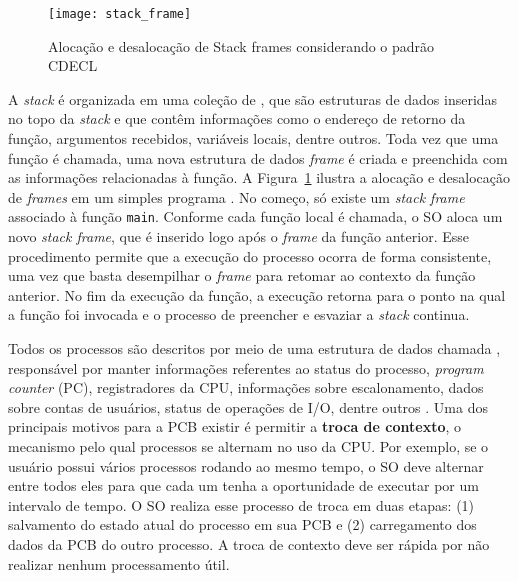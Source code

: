 \begin{figure}[!h]
  \centering
  \texttt{[image: stack\_frame]}
  \caption{Alocação e desalocação de Stack frames considerando o padrão CDECL~\citep{patterson}}
  \label{fig:stack_frames} 
\end{figure}


A \emph{stack} é organizada em uma coleção de , que
são estruturas de dados inseridas no topo da
\emph{stack} e que contêm informações como o endereço de retorno da função,
argumentos recebidos, variáveis locais, dentre outros. Toda vez que uma função
é chamada, uma nova estrutura de dados \emph{frame} é criada e preenchida com
as informações relacionadas à função.
A Figura~\ref{fig:stack_frames} ilustra a alocação e desalocação de
\textit{frames} em um simples programa \citep{gdb}. No começo, só existe um
\emph{stack frame} associado à função \texttt{main}. Conforme cada
função local é chamada, o SO aloca um novo \emph{stack frame}, que é
inserido logo após o \emph{frame} da função anterior. Esse procedimento permite
que a execução do processo ocorra de forma consistente, uma vez que basta
desempilhar o \emph{frame} para retomar ao contexto da função anterior. No fim
da execução da função, a execução retorna para o ponto na qual a função foi invocada e
o processo de preencher e esvaziar a \emph{stack} continua.

Todos os processos são descritos por meio de uma estrutura de dados chamada
, responsável por manter
informações referentes ao status do processo, \emph{program counter} (PC),
registradores da CPU, informações sobre escalonamento, dados sobre contas de
usuários, status de operações de I/O, dentre outros \citep{silberschatz}.
Uma dos principais motivos para a PCB existir é permitir a \textbf{troca de
contexto}, o mecanismo pelo qual processos se alternam no uso da CPU.
Por exemplo, se o usuário possui vários processos rodando ao mesmo tempo, o
SO deve alternar entre todos eles para que cada um tenha a oportunidade
de executar por um intervalo de tempo. O SO realiza esse processo de troca em duas
etapas: (1) salvamento do estado atual do processo em sua PCB e (2) carregamento dos dados da PCB do outro
processo. A troca de contexto deve ser rápida por não
realizar nenhum processamento útil.

